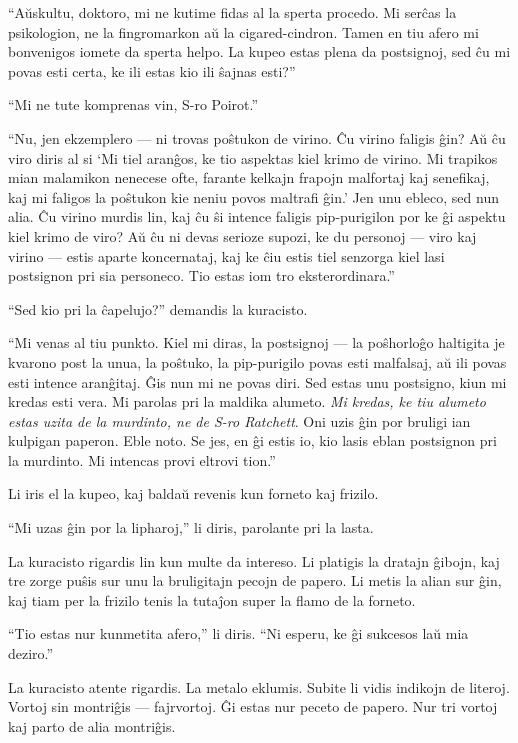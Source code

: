 ``Aŭskultu, doktoro, mi ne kutime fidas al la sperta procedo. Mi serĉas la psikologion, ne la fingromarkon aŭ la cigared-cindron. Tamen en tiu afero mi bonvenigos iomete da sperta helpo. La kupeo estas plena da postsignoj, sed ĉu mi povas esti certa, ke ili estas kio ili ŝajnas esti?''

``Mi ne tute komprenas vin, S-ro Poirot.''

``Nu, jen ekzemplero --- ni trovas poŝtukon de virino. Ĉu virino faligis ĝin? Aŭ ĉu viro diris al si `Mi tiel aranĝos, ke tio aspektas kiel krimo de virino. Mi trapikos mian malamikon nenecese ofte, farante kelkajn frapojn malfortaj kaj senefikaj, kaj mi faligos la poŝtukon kie neniu povos maltrafi ĝin.' Jen unu ebleco, sed nun alia. Ĉu virino murdis lin, kaj ĉu ŝi intence faligis pip-purigilon por ke ĝi aspektu kiel krimo de viro? Aŭ ĉu ni devas serioze supozi, ke du personoj --- viro kaj virino --- estis aparte koncernataj, kaj ke ĉiu estis tiel senzorga kiel lasi postsignon pri sia personeco. Tio estas iom tro eksterordinara.''

``Sed kio pri la ĉapelujo?'' demandis la kuracisto.

``Mi venas al tiu punkto. Kiel mi diras, la postsignoj --- la poŝhorloĝo haltigita je kvarono post la unua, la poŝtuko, la pip-purigilo povas esti malfalsaj, aŭ ili povas esti intence aranĝitaj. Ĝis nun mi ne povas diri. Sed estas unu postsigno, kiun mi kredas esti vera. Mi parolas pri la maldika alumeto. \emph{Mi kredas, ke tiu alumeto estas uzita de la murdinto, ne de S-ro Ratchett}. Oni uzis ĝin por bruligi ian kulpigan paperon. Eble noto. Se jes, en ĝi estis io, kio lasis eblan postsignon pri la murdinto. Mi intencas provi eltrovi tion.''

Li iris el la kupeo, kaj baldaŭ revenis kun forneto kaj frizilo.

``Mi uzas ĝin por la lipharoj,'' li diris, parolante pri la lasta.

La kuracisto rigardis lin kun multe da intereso. Li platigis la dratajn ĝibojn, kaj tre zorge puŝis sur unu la bruligitajn pecojn de papero. Li metis la alian sur ĝin, kaj tiam per la frizilo tenis la tutaĵon super la flamo de la forneto.

``Tio estas nur kunmetita afero,'' li diris. ``Ni esperu, ke ĝi sukcesos laŭ mia deziro.''

La kuracisto atente rigardis. La metalo eklumis. Subite li vidis indikojn de literoj. Vortoj sin montriĝis --- fajrvortoj. Ĝi estas nur peceto de papero. Nur tri vortoj kaj parto de alia montriĝis.


